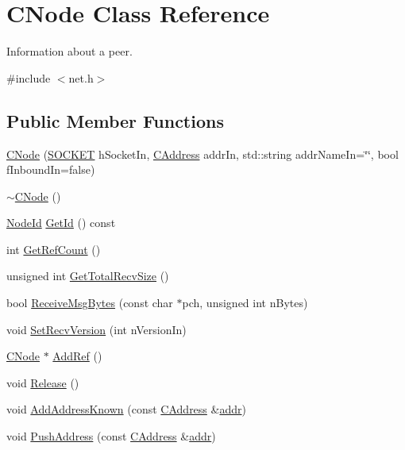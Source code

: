\hypertarget{class_c_node}{}\section{C\+Node Class Reference}
\label{class_c_node}


Information about a peer.  




{\ttfamily \#include $<$net.\+h$>$}

\subsection*{Public Member Functions}
\begin{DoxyCompactItemize}
\item 
\hyperlink{class_c_node_a51556705550511146245b9fb2fec09c1}{C\+Node} (\hyperlink{compat_8h_a26ef1173e2f2c0d3db27eca28397d723}{S\+O\+C\+K\+E\+T} h\+Socket\+In, \hyperlink{class_c_address}{C\+Address} addr\+In, std\+::string addr\+Name\+In=\char`\"{}\char`\"{}, bool f\+Inbound\+In=false)
\item 
\hyperlink{class_c_node_ac9b30cb93e91a48dacc58821abfc44f0}{$\sim$\+C\+Node} ()
\item 
\hyperlink{net_8h_a954d746a58632565552615fd0a4ee660}{Node\+Id} \hyperlink{class_c_node_ac0f1a22fa938e84138536308e2001340}{Get\+Id} () const 
\item 
int \hyperlink{class_c_node_a72211aaf51af2e981e6b8a1deb73c836}{Get\+Ref\+Count} ()
\item 
unsigned int \hyperlink{class_c_node_a2cff79a034258ba032257e993fc42e62}{Get\+Total\+Recv\+Size} ()
\item 
bool \hyperlink{class_c_node_a84a10eb3aec7fdddafeb354527b50b75}{Receive\+Msg\+Bytes} (const char $\ast$pch, unsigned int n\+Bytes)
\item 
void \hyperlink{class_c_node_a94438c6285d1635c62ccff10593780e6}{Set\+Recv\+Version} (int n\+Version\+In)
\item 
\hyperlink{class_c_node}{C\+Node} $\ast$ \hyperlink{class_c_node_afb65ed679f7bda59aab89e0f5afae292}{Add\+Ref} ()
\item 
void \hyperlink{class_c_node_af804bf7c7f9794e80a3b916e1befece9}{Release} ()
\item 
void \hyperlink{class_c_node_a1d2cecdd03c9da642d292f6a81ac6ed8}{Add\+Address\+Known} (const \hyperlink{class_c_address}{C\+Address} \&\hyperlink{class_c_node_a3993ecb1de2a2135a3cf0904346a6f88}{addr})
\item 
void \hyperlink{class_c_node_a06950a5ce265a1d4df1aad7f28e6fde8}{Push\+Address} (const \hyperlink{class_c_address}{C\+Address} \&\hyperlink{class_c_node_a3993ecb1de2a2135a3cf0904346a6f88}{addr})

\end{DoxyCompactItemize}
